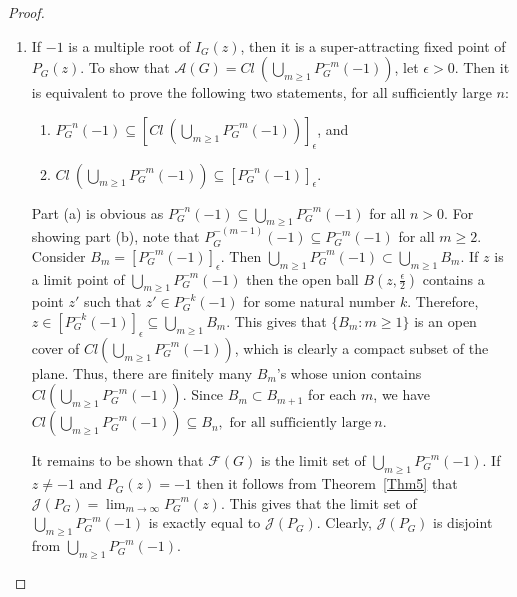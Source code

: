 \documentclass[12pt,a4paper]{article}
\theoremstyle{plain}
\numberwithin{equation}{section}
\begin{document}
\begin{proof}
\begin{enumerate}
        
            \item If \(-1\) is a multiple root of \(I_G(z)\), then it is a super-attracting fixed point of \(P_G(z)\). To show that \(\mathcal{A}(G) = Cl~\left(\bigcup_{m\geq 1}P_G^{-m}(-1)\right)\),  let \(\epsilon > 0\). Then it is equivalent to prove the following two statements, for all sufficiently large \(n\):
            \begin{enumerate}[label=(\alph{*})]
                \item \(P_G^{-n}(-1) \subseteq [Cl~\left(\bigcup_{m\geq 1}P_G^{-m}(-1)\right)]_ \epsilon\), and 
                \item \(Cl~\left(\bigcup_{m\geq 1}P_G^{-m}(-1)\right) \subseteq [P_G^{-n}(-1)]_ \epsilon\).
            \end{enumerate}
            \par
            Part (a) is obvious as \(P_G^{-n}(-1) \subseteq \bigcup_{m\geq 1}P_G^{-m}(-1) \) for all \(n>0\). For showing part (b), note that  \(P_G^{-(m-1)}(-1) \subseteq P_G^{-m}(-1)\) for all \(m\geq 2\). Consider \(  B_m = [P_G^{-m}(-1)]_\epsilon \). Then $\bigcup_{m \geq 1}P_G^{-m}(-1) \subset \bigcup_{m 
            \geq 1} B_m$.  If \(z\) is a limit point of \(\bigcup_{m\geq 1}P_G^{-m}(-1)\) then the open ball \(B(z, \frac{\epsilon}{2})\) contains a point \(z'\) such that \(z' \in P_G^{-k}(-1)\) for some natural number \(k\). Therefore, \(z \in [P_G^{-k}(-1)]_\epsilon \subseteq \bigcup_{m \geq 1}B_m\). This gives that $\{B_m : m \geq 1\}$ is an open cover of    \(Cl\left(\bigcup_{m\geq 1}P_G^{-m}(-1)\right) \), which is clearly a compact subset of the plane.  Thus, there are finitely many $B_m$'s whose union contains \(Cl\left(\bigcup_{m\geq 1}P_G^{-m}(-1)\right) \). Since $B_m  \subset B_{m+1}$ for each $m$,  we have
            $ Cl\left(\bigcup_{m\geq 1}P_G^{-m}(-1)\right) \subseteq B_n, \text{ for all sufficiently large} ~ n$.
            \par It remains to be shown that $\mathcal{F}(G)$ is the limit set of  $\bigcup_{m\geq 1}P_G^{-m}(-1)$. If $z \neq -1$ and $P_G (z)=-1$ then it follows from Theorem~\ref{Thm5} that $\mathcal{J} (P_G) =\lim_{m \to \infty} P_G ^{-m}(z)$. This gives that the limit set of $\bigcup_{m\geq 1}P_G^{-m}(-1)$ is exactly equal to  $\mathcal{J} (P_G)$. Clearly, $\mathcal{J} (P_G)$ is disjoint from $\bigcup_{m\geq 1}P_G^{-m}(-1)$.
            \end{enumerate}
    \end{proof}
\end{document}
